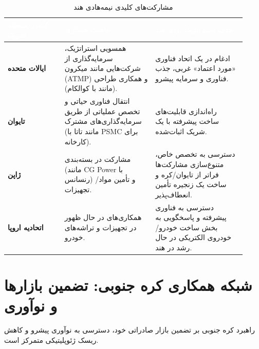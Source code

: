 \documentclass[10pt]{report}
\begin{document}
\begin{table}[H]
    \centering
    \caption{مشارکت‌های کلیدی نیمه‌هادی هند}
    \label{tab:india_partners}
    \begin{tabular}{P{0.22\linewidth} P{0.35\linewidth} P{0.35\linewidth}}
        \toprule
        \textcolor{white}{\textbf{کشور/منطقه شریک}} & \textcolor{white}{\textbf{ماهیت همکاری}} & \textcolor{white}{\textbf{هدف استراتژیک برای هند}} \\
        \midrule
        \textbf{ایالات متحده} & همسویی استراتژیک، سرمایه‌گذاری از شرکت‌هایی مانند میکرون (ATMP) و همکاری طراحی (مانند با کوالکام). & ادغام در یک اتحاد فناوری «مورد اعتماد» غربی، جذب فناوری و سرمایه پیشرو. \\
        \textbf{تایوان} & انتقال فناوری حیاتی و تخصص عملیاتی از طریق سرمایه‌گذاری‌های مشترک (مانند تاتا با PSMC برای کارخانه). & راه‌اندازی قابلیت‌های ساخت پیشرفته با یک شریک اثبات‌شده. \\
        \textbf{ژاپن} & مشارکت در بسته‌بندی (مانند CG Power با رنسانس) و تأمین مواد/تجهیزات. & دسترسی به تخصص خاص، متنوع‌سازی مشارکت‌ها فراتر از تایوان/کره و ساخت یک زنجیره تأمین انعطاف‌پذیر. \\
        \textbf{اتحادیه اروپا} & همکاری‌های در حال ظهور در تجهیزات و تراشه‌های خودرو. & دسترسی به فناوری پیشرفته و پاسخگویی به بخش ساخت خودرو/خودروی الکتریکی در حال رشد در هند. \\
        \bottomrule
    \end{tabular}
\end{table}

\section{شبکه همکاری کره جنوبی: تضمین بازارها و نوآوری}
راهبرد کره جنوبی بر تضمین بازار صادراتی خود، دسترسی به نوآوری پیشرو و کاهش ریسک ژئوپلیتیکی متمرکز است.
\end{document}
